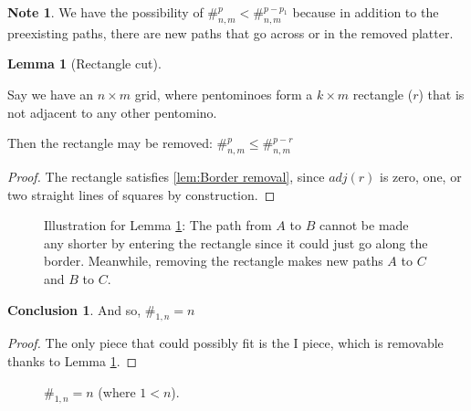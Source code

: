 \documentclass{article}
\theoremstyle{definition}%
\newtheorem{lemma}[theorem]{Lemma}
\newtheorem*{conclusion}{Conclusion}
\newtheorem*{note}{Note}
\begin{document}
\begin{note}
We have the possibility of $\#^{p}_{n, m} < \#^{p - p_1}_{n, m}$ because in addition to the preexisting paths, there are new paths that go across or in the removed platter.
\end{note}

\begin{lemma}[Rectangle cut]
\label{lem:Rectangle cut}

Say we have an $n \times m$ grid, where pentominoes form a $k \times m$ rectangle ($r$) that is not adjacent to any other pentomino.

Then the rectangle may be removed: $\#^{p}_{n, m} \le \#^{p - r}_{n, m}$
\end{lemma}

\begin{proof}
The rectangle satisfies \ref{lem:Border removal}, since $adj(r)$ is zero, one, or two straight lines of squares by construction.
\end{proof}

\begin{figure}[!h]
    \centering
    \caption{Illustration for Lemma \ref{lem:Rectangle cut}: The path from $A$ to $B$ cannot be made any shorter by entering the rectangle since it could just go along the border. Meanwhile, removing the rectangle makes new paths $A$ to $C$ and $B$ to $C$.}
\end{figure}

\begin{conclusion}
And so, $\#_{1, n} = n$
\end{conclusion}

\begin{proof}
The only piece that could possibly fit is the I piece, which is removable thanks to Lemma \ref{lem:Rectangle cut}.
\end{proof}

\begin{figure}[!h]
    \centering
    \caption{$\#_{1, n} = n$ (where $1 < n$). \cite{sheet}}
\end{figure}
\end{document}
